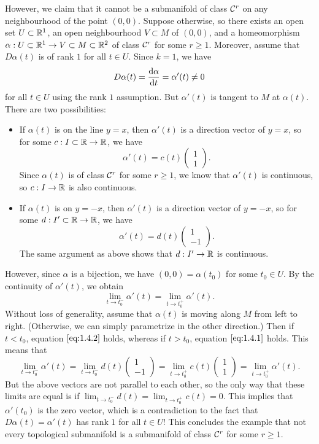 However, we claim that it cannot be a submanifold of 
class ${\cal C}^r$ on any neighbourhood of the point $(0, 0)$. 
Suppose otherwise, so there exists an open set $U \subset \mathbb{R}^1$, 
an open neighbourhood $V \subset M$ of $(0, 0)$, and a homeomorphism 
$\alpha : U \subset \mathbb{R}^1 \to V \subset M \subset \mathbb{R}^2$ of class ${\cal C}^r$ 
for some $r \geq 1$. Moreover, assume that $D\alpha(t)$ is of rank $1$ 
for all $t \in U$. Since $k = 1$, we have 
\[ D\alpha(t) = \frac{{\rm d}\alpha}{{\rm d}t} = \alpha'(t) \neq 0 \] 
for all $t \in U$ using the rank $1$ assumption. But $\alpha'(t)$ 
is tangent to $M$ at $\alpha(t)$. There are two possibilities: 
\begin{itemize}
    \item If $\alpha(t)$ is on the line $y = x$, then $\alpha'(t)$ 
    is a direction vector of $y = x$, so for some $c : I 
    \subset \mathbb{R} \to \mathbb{R}$, we have 
    \[ \alpha'(t) = c(t) \begin{pmatrix} 1 \\ 1 \end{pmatrix}. \tag{1.4.1} \label{eq:1.4.1}\] 
    Since $\alpha(t)$ is of class ${\cal C}^r$ for some $r \geq 1$, we know that 
    $\alpha'(t)$ is continuous, so $c : I \to \mathbb{R}$ is also continuous.
    \item If $\alpha(t)$ is on $y = -x$, then $\alpha'(t)$ is a 
    direction vector of $y = -x$, so for some $d : I' \subset \mathbb{R} \to \mathbb{R}$, 
    we have 
    \[ \alpha'(t) = d(t) \begin{pmatrix} 1 \\ -1 \end{pmatrix}. \tag{1.4.2} \label{eq:1.4.2} \] 
    The same argument as above shows that $d : I' \to \mathbb{R}$ is continuous.
\end{itemize}
However, since $\alpha$ is a bijection, we have $(0, 0) = \alpha(t_0)$ 
for some $t_0 \in U$. By the continuity of $\alpha'(t)$, we obtain 
\[ \lim_{t\to t_0^-} \alpha'(t) = \lim_{t\to t_0^+} \alpha'(t). \] 
Without loss of generality, assume that $\alpha(t)$ is moving along $M$ 
from left to right. (Otherwise, we can simply parametrize in the other 
direction.) Then if $t < t_0$, equation $\eqref{eq:1.4.2}$ holds, whereas if 
$t > t_0$, equation $\eqref{eq:1.4.1}$ holds. This means that 
\[ \lim_{t\to t_0^-} \alpha'(t) = \lim_{t\to t_0^-} d(t) \begin{pmatrix} 1 \\ -1 \end{pmatrix} 
= \lim_{t\to t_0^+} c(t) \begin{pmatrix} 1 \\ 1 \end{pmatrix} = \lim_{t\to t_0^+} \alpha'(t). \] 
But the above vectors are not parallel to each other, so the only way that 
these limits are equal is if $\lim_{t\to t_0^-} d(t) = 
\lim_{t\to t_0^+} c(t) = 0$. This implies that $\alpha'(t_0)$ is the zero 
vector, which is a contradiction to the fact that $D\alpha(t) = \alpha'(t)$ 
has rank $1$ for all $t \in U$! This concludes the example that not 
every topological submanifold is a submanifold of class ${\cal C}^r$ for some $r \geq 1$. 

